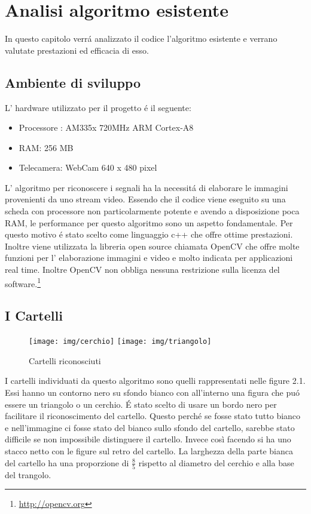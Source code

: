 \chapter{Analisi algoritmo esistente}

In questo capitolo verr\'a analizzato il codice l'algoritmo esistente e verrano valutate prestazioni ed efficacia di esso.


\section{Ambiente di sviluppo}

	L' hardware utilizzato per il progetto \'e il seguente:
	\begin{itemize}
	\item Processore : AM335x 720MHz ARM Cortex-A8
	\item RAM: 256 MB
	\item Telecamera: WebCam 640 x 480 pixel
	\end{itemize}

	L' algoritmo per riconoscere i segnali ha la necessit\'a di elaborare le immagini provenienti da uno stream video. Essendo che il codice viene eseguito su una scheda con processore non particolarmente potente e avendo a disposizione poca RAM, le performance per questo algoritmo sono un aspetto fondamentale. Per questo motivo \'e stato scelto come linguaggio c++ che offre ottime prestazioni. Inoltre viene utilizzata la libreria open source chiamata OpenCV che offre molte funzioni per l' elaborazione immagini e video e molto indicata per applicazioni real time. Inoltre OpenCV non obbliga nessuna restrizione sulla licenza del software.\footnote{\url{http://opencv.org}}

\section{I Cartelli}
	\begin{figure}[!ht]
		\centering
		\texttt{[image: img/cerchio]}
		\texttt{[image: img/triangolo]}
		\caption{Cartelli riconosciuti}
	\end{figure}
	I cartelli individuati da questo algoritmo sono quelli rappresentati nelle figure 2.1.
	Essi hanno un contorno nero su sfondo bianco con all'interno una figura che pu\'o essere un triangolo o un cerchio.
	\'E stato scelto di usare un bordo nero per facilitare il riconoscimento del cartello. Questo perch\'e se fosse stato tutto bianco e nell'immagine ci fosse stato del bianco sullo sfondo del cartello, sarebbe stato difficile se non impossibile distinguere il cartello. Invece così facendo si ha uno stacco netto con le figure sul retro del cartello. La larghezza della parte bianca del cartello ha una proporzione di $\tfrac{8}{5}$ rispetto al diametro del cerchio e alla base del trangolo.

